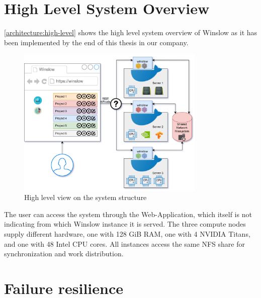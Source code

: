 
\section{High Level System Overview}


\autoref{architecture:high-level} shows the high level system overview of Winslow as it has been implemented by the end of this thesis in our company.

\begin{figure}[H]
	\centering
	\includegraphics[width=0.8\textwidth]{architecture.png}
	\caption{High level view on the system structure}
	\label{architecture:high-level}
\end{figure}

The user can access the system through the Web-Application, which itself is not indicating from which Winslow instance it is served.
The three compute nodes supply different hardware, one with 128 GiB RAM, one with 4 NVIDIA Titans, and one with 48 Intel CPU cores.
All instances access the same NFS share for synchronization and work distribution.



\section{Failure resilience}

